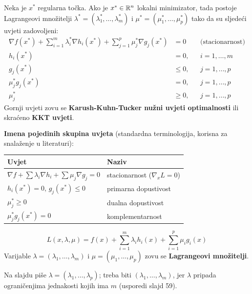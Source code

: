 \begin{teorem}
Neka je $x^{*}$ regularna točka. Ako je $x^{*} \in \mathbb{R}^n$ lokalni minimizator,
tada postoje Lagrangeovi množitelji $\lambda^{*} = (\lambda_1^{*},\dots,
\lambda_m^{*})$ i $\mu^{*} = (\mu_1^{*},\dots,\mu_p^{*})$ tako da su sljedeći
uvjeti zadovoljeni:
\begin{align}
\nabla f(x^{*}) + \sum_{i=1}^{m}\lambda_i^{*}\nabla h_i(x^{*})
  + \sum_{j=1}^{p}\mu_j^{*}\nabla g_j(x^{*}) &= 0
  &&\text{(stacionarnost)} \\
h_i(x^{*}) &= 0, && i = 1,\dots,m \\
g_j(x^{*}) &\le 0, && j = 1,\dots,p \\
\mu_j^{*}g_j(x^{*}) &= 0, && j = 1,\dots,p \\
\mu_j^{*} &\ge 0, && j = 1,\dots,p
\end{align}
Gornji uvjeti zovu se \textbf{Karush-Kuhn-Tucker nužni uvjeti optimalnosti} ili
skraćeno \textbf{KKT uvjeti}.
\end{teorem}

\textbf{Imena pojedinih skupina uvjeta} (standardna terminologija, korisna za
snalaženje u literaturi):

\begin{center}
\begin{tabular}{ll}
\toprule
\textbf{Uvjet} & \textbf{Naziv} \\
\midrule
$\nabla f + \sum\lambda_i\nabla h_i + \sum\mu_j\nabla g_j = 0$
  & stacionarnost ($\nabla_x L = 0$) \\
$h_i(x^{*}) = 0$, $g_j(x^{*}) \le 0$ & primarna dopustivost \\
$\mu_j^{*} \ge 0$ & dualna dopustivost \\
$\mu_j^{*}g_j(x^{*}) = 0$ & komplementarnost \\
\bottomrule
\end{tabular}
\end{center}

\begin{definicija}
\[
L(x,\lambda,\mu) = f(x) + \sum_{i=1}^{m}\lambda_ih_i(x)
                        + \sum_{i=1}^{p}\mu_ig_i(x)
\]
Varijable $\lambda = (\lambda_1,\dots,\lambda_m)$ i
$\mu = (\mu_1,\dots,\mu_p)$ zovu se \textbf{Lagrangeovi množitelji}.
\end{definicija}

\begin{napomena}
Na slajdu piše $\lambda = (\lambda_1,\dots,\lambda_p)$; treba biti
$(\lambda_1,\dots,\lambda_m)$, jer $\lambda$ pripada ograničenjima jednakosti
kojih ima $m$ (usporedi slajd 59).
\end{napomena}

